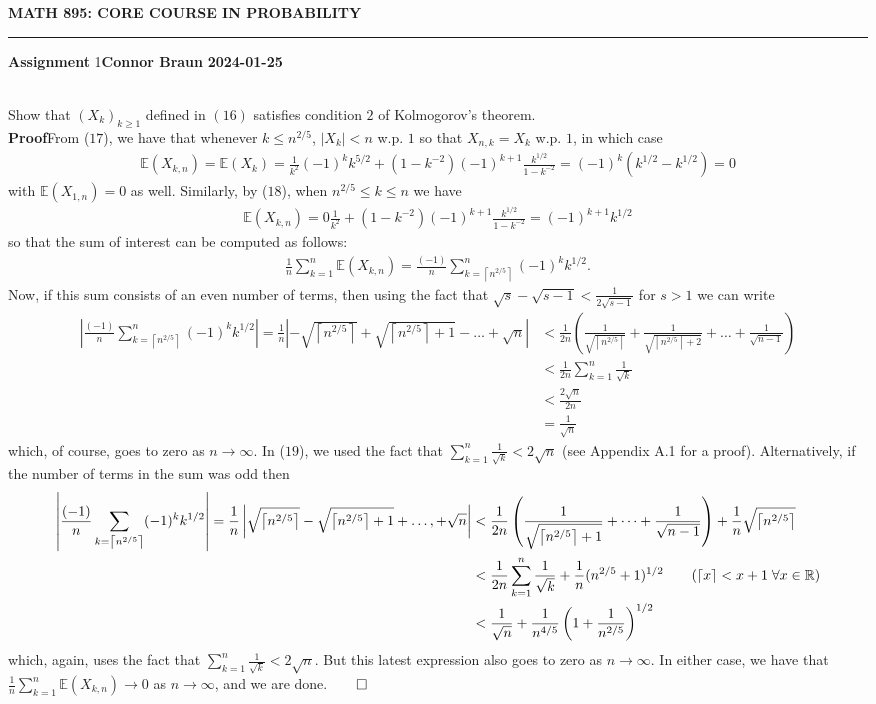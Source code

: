 \documentclass[10pt]{article}
\newcommand{\E}{\mathbb{E}}
\newcommand{\bp}[1]{\left({#1}\right)}
\newcommand{\mbb}[1]{\mathbb{#1}}
\newcommand{\1}[1]{\mathbbm{1}_{#1}}
\newcommand*{\ceil}[1]{\left\lceil#1\right\rceil}
\begin{document}
    \begin{center}
        {\bf\large{MATH 895: CORE COURSE IN PROBABILITY}}
        \smallskip
        \hrule
        \smallskip
        {\bf Assignment} 1\hfill {\bf Connor Braun} \hfill {\bf 2024-01-25}
    \end{center}
    \\[5pt]
    Show that $(X_k)_{k\geq 1}$ defined in $(16)$ satisfies condition $2$ of Kolmogorov's theorem.\\[5pt]
    {\bf Proof}\hspace{5pt}From ($17$), we have that whenever $k\leq n^{2/5}$, $|X_k|<n$ w.p. $1$ so that $X_{n,k}=X_k$ w.p. $1$, in which case
    \begin{align*}
        \E(X_{k,n})=\E(X_k)=\frac{1}{k^2}(-1)^kk^{5/2}+(1-k^{-2})(-1)^{k+1}\frac{k^{1/2}}{1-k^{-2}}=(-1)^k(k^{1/2}-k^{1/2})=0
    \end{align*}
    with $\E(X_{1,n})=0$ as well. Similarly, by ($18$), when $n^{2/5}\leq k\leq n$ we have
    \begin{align*}
        \E(X_{k,n})=0\frac{1}{k^2}+(1-k^{-2})(-1)^{k+1}\frac{k^{1/2}}{1-k^{-2}}=(-1)^{k+1}k^{1/2}
    \end{align*}
    so that the sum of interest can be computed as follows:
    \begin{align*}
        \frac{1}{n}\sum_{k=1}^n\E(X_{k,n})=\frac{(-1)}{n}\sum_{k=\ceil{n^{2/5}}}^n(-1)^kk^{1/2}.
    \end{align*}
    Now, if this sum consists of an even number of terms, then using the fact that $\sqrt{s}-\sqrt{s-1}<\tfrac{1}{2\sqrt{s-1}}$ for $s>1$ we can write
    \begin{align*}
        \left|\frac{(-1)}{n}\sum_{k=\ceil{n^{2/5}}}^n(-1)^kk^{1/2}\right|=\frac{1}{n}\left|-\sqrt{\ceil{n^{2/5}}}+\sqrt{\ceil{n^{2/5}}+1}-\dots+\sqrt{n}\right|&<\frac{1}{2n}\bp{\frac{1}{\sqrt{\ceil{n^{2/5}}}}+\frac{1}{\sqrt{\ceil{n^{2/5}}+2}}+\dots+\frac{1}{\sqrt{n-1}}}\\
        &<\frac{1}{2n}\sum_{k=1}^{n}\frac{1}{\sqrt{k}}\\
        &<\frac{2\sqrt{n}}{2n}\tag{19}\\
        &=\frac{1}{\sqrt{n}}
    \end{align*}
    which, of course, goes to zero as $n\rightarrow\infty$. In ($19$), we used the fact that $\sum_{k=1}^n\tfrac{1}{\sqrt{k}}<2\sqrt{n}$ (see Appendix A.1 for a proof). Alternatively, if the number of terms in the sum was odd then
    \begin{align*}
        \left|\frac{(-1)}{n}\sum_{k=\ceil{n^{2/5}}}(-1)^kk^{1/2}\right|=\frac{1}{n}\left|\sqrt{\ceil{n^{2/5}}}-\sqrt{\ceil{n^{2/5}}+1}+\dots,+\sqrt{n}\right|&<\frac{1}{2n}\bp{\frac{1}{\sqrt{\ceil{n^{2/5}}+1}}+\dots+\frac{1}{\sqrt{n-1}}}+\frac{1}{n}\sqrt{\ceil{n^{2/5}}}\\
        &<\frac{1}{2n}\sum_{k=1}^n\frac{1}{\sqrt{k}}+\frac{1}{n}(n^{2/5}+1)^{1/2}\tag{$\ceil{x}<x+1\;\forall x\in\mbb{R}$}\\
        &<\frac{1}{\sqrt{n}}+\frac{1}{n^{4/5}}\bp{1+\frac{1}{n^{2/5}}}^{1/2}
    \end{align*}
    which, again, uses the fact that $\sum_{k=1}^n\tfrac{1}{\sqrt{k}}<2\sqrt{n}$. But this latest expression also goes to zero as $n\rightarrow\infty$. In either case, we have that $\frac{1}{n}\sum_{k=1}^n\E(X_{k,n})\rightarrow 0$ as $n\rightarrow\infty$, and we are done.\hfill{$\qed$}\\[5pt]
\end{document}

